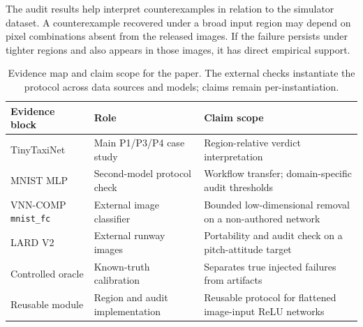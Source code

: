 \documentclass[twocolumn,smallextended,runningheads]{svjour3}
\newcommand{\sttttablefont}{\footnotesize}
\begin{document}
The audit results help interpret counterexamples in relation to the simulator dataset. A counterexample recovered under a broad input region may depend on pixel combinations absent from the released images. If the failure persists under tighter regions and also appears in those images, it has direct empirical support.

\begin{table}[t]
\centering
\sttttablefont
\setlength{\tabcolsep}{4pt}
\begin{tabular}{p{}p{}p{}}
\toprule
Evidence block & Role & Claim scope \\
\midrule
TinyTaxiNet & Main P1/P3/P4 case study & Region-relative verdict interpretation \\
MNIST MLP & Second-model protocol check & Workflow transfer; domain-specific audit thresholds \\
VNN-COMP \texttt{mnist\_fc} & External image classifier & Bounded low-dimensional removal on a non-authored network \\
LARD V2 & External runway images & Portability and audit check on a pitch-attitude target \\
Controlled oracle & Known-truth calibration & Separates true injected failures from artifacts \\
Reusable module & Region and audit implementation & Reusable protocol for flattened image-input ReLU networks \\
\bottomrule
\end{tabular}
\caption{Evidence map and claim scope for the paper. The external checks instantiate the protocol across data sources and models; claims remain per-instantiation.}
\label{tab:evidence_map}
\end{table}
\end{document}
